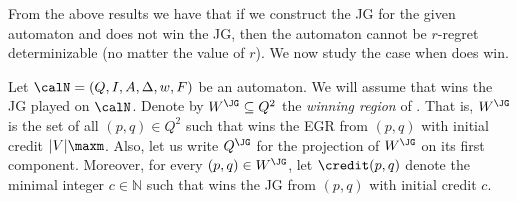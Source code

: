 \documentclass[a4paper]{article}
\begin{document}
From the above results we have that if we construct the JG for the given
automaton and \eve does not win the JG, then the automaton cannot be $r$-regret
determinizable (no matter the value of $r$). We now study the
case when \eve does win.

Let $\calN = (Q,I,A,\Delta,w,F)$ be an automaton.  We will assume that \eve wins
the JG played on $\calN$. Denote by $W^{\JG} \subseteq Q^2$ the
\emph{winning region} of \eve. That is, $W^{\JG}$ is the set of all $(p,q) \in
Q^2$ such that \eve wins the EGR from $(p,q)$ with initial credit
$|V|\maxm$.  Also, let us write $Q^{\JG}$ for the projection of $W^{\JG}$
on its first component.  Moreover, for every $(p,q) \in W^{\JG}$, let
$\credit(p,q)$ denote the minimal integer $c \in \mathbb{N}$ such that \eve wins
the JG from $(p,q)$ with initial credit $c$.
\end{document}

